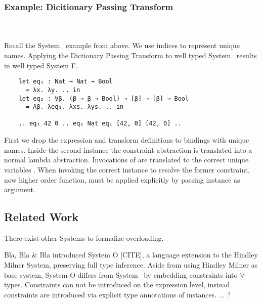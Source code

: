 \subsubsection{Example: Dicitionary Passing Transform}\hfill\\\\
Recall the System \Fo\ example from above. We use indices to represent unique names.
Applying the Dictionary Passing Transform to well typed System \Fo\ results in well typed System F.
\begin{verbatim}
    let eq₁ : Nat → Nat → Bool 
      = λx. λy. .. in
    let eq₂ : ∀β. (β → β → Bool) → [β] → [β] → Bool 
      = Λβ. λeq₁. λxs. λys. .. in
    
    .. eq₁ 42 0 .. eq₂ Nat eq₁ [42, 0] [42, 0] .. 
\end{verbatim}
First we drop the \inl{|\Decl|}expression and transform \inl{|\Inst|}definitions to  bindings with unique names. 
Inside the second instance the constraint abstraction is translated into a normal lambda abstraction. 
Invocations of  are translated to the correct unique variables .
When invoking  the correct instance to resolve the former constraint, now higher order function, must be applied explicitly by passing instance  as argument.

\subsection{Related Work}
There exist other Systems to formalize overloading. 

Bla, Bla \& Bla introduced System O [CITE], a language extension to the Hindley Milner System, preserving full type inference. 
Aside from using Hindley Milner as base system, System O differs from System \Fo\ by embedding constraints into $\forall$-types. 
Constraints can not be introduced on the expression level, instead constraints are introduced via explicit type annotations of instances. 
... ?
